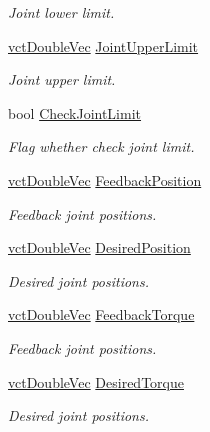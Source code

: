 \begin{DoxyCompactItemize}
\begin{DoxyCompactList}\small\item\em Joint lower limit. \end{DoxyCompactList}\item 
\hyperlink{vct_dynamic_vector_types_8h_ade4b3068c86fb88f41af2e5187e491c2}{vct\+Double\+Vec} \hyperlink{classmts_p_i_d_a6a6f2a5123f6816f47d5c752ba7020d5}{Joint\+Upper\+Limit}
\begin{DoxyCompactList}\small\item\em Joint upper limit. \end{DoxyCompactList}\item 
bool \hyperlink{classmts_p_i_d_a951636db1802cb277a716bd8ee8aea45}{Check\+Joint\+Limit}
\begin{DoxyCompactList}\small\item\em Flag whether check joint limit. \end{DoxyCompactList}\item 
\hyperlink{vct_dynamic_vector_types_8h_ade4b3068c86fb88f41af2e5187e491c2}{vct\+Double\+Vec} \hyperlink{classmts_p_i_d_a52a65fa9afc1f295b483dcd4522244c3}{Feedback\+Position}
\begin{DoxyCompactList}\small\item\em Feedback joint positions. \end{DoxyCompactList}\item 
\hyperlink{vct_dynamic_vector_types_8h_ade4b3068c86fb88f41af2e5187e491c2}{vct\+Double\+Vec} \hyperlink{classmts_p_i_d_a261ceede64958a11dc2f2b58207a83e7}{Desired\+Position}
\begin{DoxyCompactList}\small\item\em Desired joint positions. \end{DoxyCompactList}\item 
\hyperlink{vct_dynamic_vector_types_8h_ade4b3068c86fb88f41af2e5187e491c2}{vct\+Double\+Vec} \hyperlink{classmts_p_i_d_a70a6622da968b22d790eebbbfa584c26}{Feedback\+Torque}
\begin{DoxyCompactList}\small\item\em Feedback joint positions. \end{DoxyCompactList}\item 
\hyperlink{vct_dynamic_vector_types_8h_ade4b3068c86fb88f41af2e5187e491c2}{vct\+Double\+Vec} \hyperlink{classmts_p_i_d_a7756c43c46391cfc929a46c0e99b12a0}{Desired\+Torque}
\begin{DoxyCompactList}\small\item\em Desired joint positions. \end{DoxyCompactList}\item 

\end{DoxyCompactItemize}
